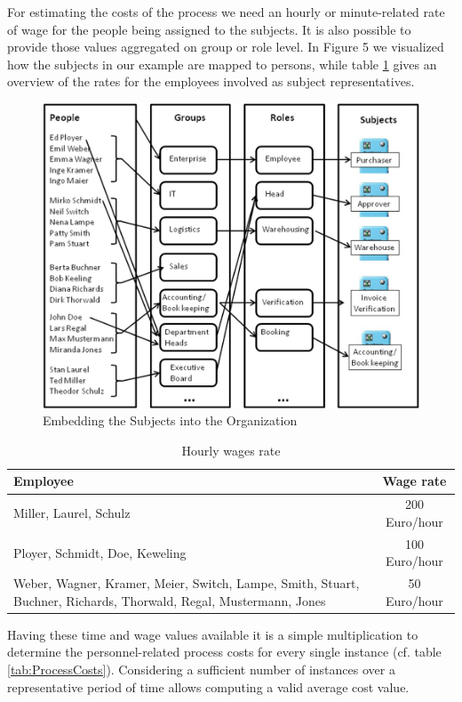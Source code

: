 For estimating the costs of the process we need an hourly or minute-related rate of wage for the people being assigned to the subjects. It is also possible to provide those values aggregated on group or role level. In Figure 5 we visualized how the subjects in our example are mapped to persons, while table \ref{tab:HourlyWages} gives an overview of the rates for the employees involved as subject representatives.

\begin{figure}[htbp]
	\centering
	\includegraphics[width=0.6\linewidth] {Figures/Chapter5/ActivityBased/embedding.jpg}
	\caption[Embedding the Subjects into the Organization]{Embedding the Subjects into the Organization}
	\label{fig:Embedding}
\end{figure}

\begin{table}[htbp]
	\centering
	\begin{tabular}{|p{10.0 cm } |c|}
		\hline
		\textbf{Employee} & \textbf{Wage rate} \\
		\hline
		\hline
		Miller, Laurel, Schulz & 200 Euro/hour\\
		\hline
		Ployer, Schmidt, Doe, Keweling & 100 Euro/hour\\
		\hline
		Weber, Wagner, Kramer, Meier, Switch, Lampe, Smith, Stuart, Buchner, Richards, Thorwald, Regal, Mustermann, Jones & 50 Euro/hour\\
		\hline
	\end{tabular}
\label{tab:HourlyWages}
\caption{Hourly wages rate}
\end{table}



Having these time and wage values available it is a simple multiplication to determine the personnel-related process costs for every single instance (cf. table \ref{tab:ProcessCosts}). Considering a sufficient number of instances over a representative period of time allows computing a valid average cost value.

